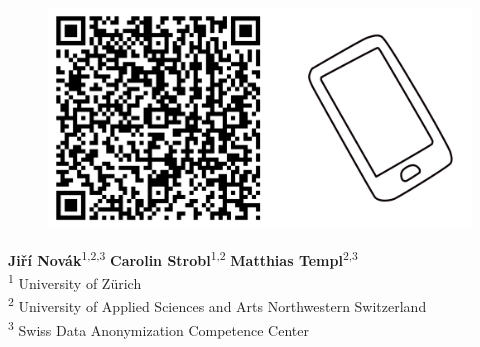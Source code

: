 \documentclass[a0,portrait]{a0poster}
\begin{document}
\begin{figure}[h]
\begin{minipage}{.15\linewidth}
\end{minipage}
\hspace{\fill} %
\begin{minipage}{.24\linewidth}
  \includegraphics[width=1\linewidth]{Poster TEX/style/qr-code.png}
  
\end{minipage}
\end{figure}

\begin{minipage}[t]{.7\linewidth}
\vfill
\makeatletter
\raggedright{\fontsize{130pt}{100pt}\selectfont\color{uzhblau100}\textbf{{\@title}}\par}
\makeatother
\color{Black}
\vspace{1cm}
\end{minipage}
\begin{minipage}[t]{.3\linewidth}
\vfill
\raggedleft
\large
\textbf{Jiří Novák}\textsuperscript{1,2,3} 
\textbf{Carolin Strobl}\textsuperscript{1,2}
\textbf{Matthias Templ}\textsuperscript{2,3} \\
\vspace{0.2cm}
\large
\textsuperscript{1} University of Zürich \\
\textsuperscript{2} University of Applied Sciences and Arts Northwestern Switzerland  \\
\textsuperscript{3} Swiss Data Anonymization Competence Center
\end{minipage}
\end{document}
